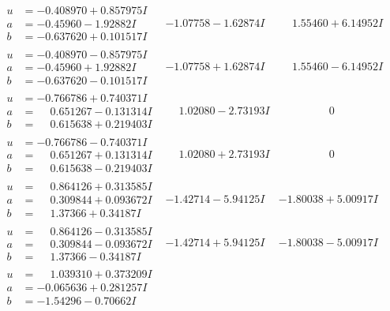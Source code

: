\documentclass[1p]{elsarticle_modified}
\theoremstyle{definition}
\begin{document}
$$\begin{array}{c|c|c}
\begin{aligned}
u &= -0.408970 + 0.857975 I \\
a &= -0.45960 - 1.92882 I \\
b &= -0.637620 + 0.101517 I\end{aligned}
 & -1.07758 - 1.62874 I & \phantom{-}1.55460 + 6.14952 I \\ \hline\begin{aligned}
u &= -0.408970 - 0.857975 I \\
a &= -0.45960 + 1.92882 I \\
b &= -0.637620 - 0.101517 I\end{aligned}
 & -1.07758 + 1.62874 I & \phantom{-}1.55460 - 6.14952 I \\ \hline\begin{aligned}
u &= -0.766786 + 0.740371 I \\
a &= \phantom{-}0.651267 - 0.131314 I \\
b &= \phantom{-}0.615638 + 0.219403 I\end{aligned}
 & \phantom{-}1.02080 - 2.73193 I & \phantom{-0.000000 } 0 \\ \hline\begin{aligned}
u &= -0.766786 - 0.740371 I \\
a &= \phantom{-}0.651267 + 0.131314 I \\
b &= \phantom{-}0.615638 - 0.219403 I\end{aligned}
 & \phantom{-}1.02080 + 2.73193 I & \phantom{-0.000000 } 0 \\ \hline\begin{aligned}
u &= \phantom{-}0.864126 + 0.313585 I \\
a &= \phantom{-}0.309844 + 0.093672 I \\
b &= \phantom{-}1.37366 + 0.34187 I\end{aligned}
 & -1.42714 - 5.94125 I & -1.80038 + 5.00917 I \\ \hline\begin{aligned}
u &= \phantom{-}0.864126 - 0.313585 I \\
a &= \phantom{-}0.309844 - 0.093672 I \\
b &= \phantom{-}1.37366 - 0.34187 I\end{aligned}
 & -1.42714 + 5.94125 I & -1.80038 - 5.00917 I \\ \hline\begin{aligned}
u &= \phantom{-}1.039310 + 0.373209 I \\
a &= -0.065636 + 0.281257 I \\
b &= -1.54296 - 0.70662 I\end{aligned}

\end{array}$$
\end{document}
